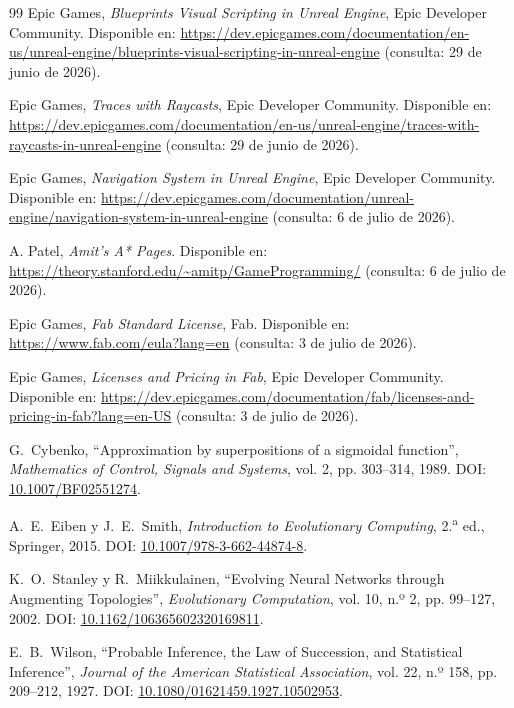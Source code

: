 \begin{sloppypar}
\begin{thebibliography}{99}
Epic Games, \textit{Blueprints Visual Scripting in Unreal Engine}, Epic Developer Community. Disponible en: \url{https://dev.epicgames.com/documentation/en-us/unreal-engine/blueprints-visual-scripting-in-unreal-engine} (consulta: 29 de junio de 2026).

Epic Games, \textit{Traces with Raycasts}, Epic Developer Community. Disponible en: \url{https://dev.epicgames.com/documentation/en-us/unreal-engine/traces-with-raycasts-in-unreal-engine} (consulta: 29 de junio de 2026).

Epic Games, \textit{Navigation System in Unreal Engine}, Epic Developer Community. Disponible en: \url{https://dev.epicgames.com/documentation/unreal-engine/navigation-system-in-unreal-engine} (consulta: 6 de julio de 2026).

A. Patel, \textit{Amit's A* Pages}. Disponible en: \url{https://theory.stanford.edu/~amitp/GameProgramming/} (consulta: 6 de julio de 2026).

Epic Games, \textit{Fab Standard License}, Fab. Disponible en: \url{https://www.fab.com/eula?lang=en} (consulta: 3 de julio de 2026).

Epic Games, \textit{Licenses and Pricing in Fab}, Epic Developer Community. Disponible en: \url{https://dev.epicgames.com/documentation/fab/licenses-and-pricing-in-fab?lang=en-US} (consulta: 3 de julio de 2026).

G.~Cybenko, ``Approximation by superpositions of a sigmoidal function'', \textit{Mathematics of Control, Signals and Systems}, vol. 2, pp. 303--314, 1989. DOI\@: \href{https://doi.org/10.1007/BF02551274}{10.1007/BF02551274}.

A.~E.~Eiben y J.~E.~Smith, \textit{Introduction to Evolutionary Computing}, 2.\textsuperscript{a} ed., Springer, 2015. DOI\@: \href{https://doi.org/10.1007/978-3-662-44874-8}{10.1007/978-3-662-44874-8}.

K.~O.~Stanley y R.~Miikkulainen, ``Evolving Neural Networks through Augmenting Topologies'', \textit{Evolutionary Computation}, vol. 10, n.º 2, pp. 99--127, 2002. DOI\@: \href{https://doi.org/10.1162/106365602320169811}{10.1162/106365602320169811}.

E.~B.~Wilson, ``Probable Inference, the Law of Succession, and Statistical Inference'', \textit{Journal of the American Statistical Association}, vol. 22, n.º 158, pp. 209--212, 1927. DOI\@: \href{https://doi.org/10.1080/01621459.1927.10502953}{10.1080/01621459.1927.10502953}.


\end{thebibliography}
\end{sloppypar}
